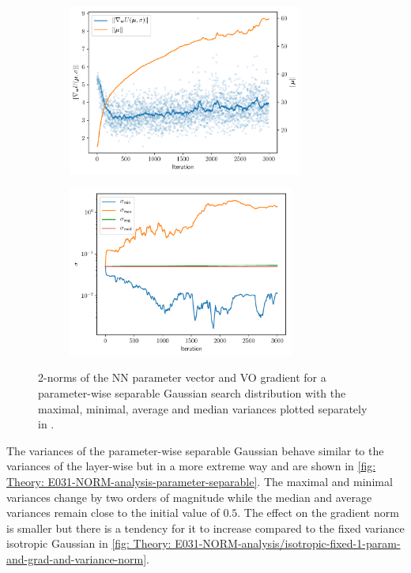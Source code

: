 \begin{figure}[tbp!]
    \begin{subfigure}[b]{0.49\textwidth}
        \centering
        \includegraphics[height=5.6cm]{graphics/E031-NORM-analysis/separable-parameter-1-param-and-grad-norm.pdf}
        \caption{}
        \label{fig: Theory: E031-NORM-analysis/separable-parameter-1-param-and-grad-norm}
    \end{subfigure}
    \hfill
    \begin{subfigure}[b]{0.49\textwidth}
        \centering
        \includegraphics[height=5.6cm]{graphics/E031-NORM-analysis/separable-parameter-1-variance.pdf}
        \caption{}
        \label{fig: Theory: E031-NORM-analysis/separable-parameter-1-variance}
    \end{subfigure}
    \caption{
         2-norms of the \gls{NN} parameter vector and \gls{VO} gradient for a parameter-wise separable Gaussian search distribution with the maximal, minimal, average and median variances plotted separately in .
    }
    \label{fig: Theory: E031-NORM-analysis-parameter-separable}
\end{figure}
The variances of the parameter-wise separable Gaussian behave similar to the variances of the layer-wise but in a more extreme way and are shown in \autoref{fig: Theory: E031-NORM-analysis-parameter-separable}. The maximal and minimal variances change by two orders of magnitude while the median and average variances remain close to the initial value of $0.5$. The effect on the gradient norm is smaller but there is a tendency for it to increase compared to the fixed variance isotropic Gaussian in \autoref{fig: Theory: E031-NORM-analysis/isotropic-fixed-1-param-and-grad-and-variance-norm}. 
